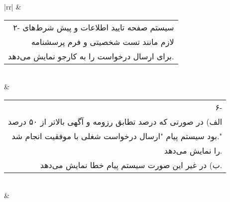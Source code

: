 \documentclass[12pt]{article}
\begin{document}
\begin{table}[]
\begin{tabular}{|rr|}
			                                           & \begin{tabular}[c]{@{}r@{}}۲- سیستم صفحه تایید اطلاعات و پیش شرط‌های\\  لازم مانند تست شخصیتی و فرم پرسشنامه\\  برای ارسال درخواست را به کارجو نمایش می‌دهد.\end{tabular}                                                                 \\ \hline
			 & \begin{tabular}[c]{@{}r@{}}۶- \\ الف) در صورتی که درصد تطابق رزومه و آگهی بالاتر از ۵۰ درصد\\  بود سیستم پیام "ارسال درخواست شغلی با موفقیت انجام شد." \\ را نمایش می‌دهد.\\ ب) در غیر این صورت سیستم پیام خطا نمایش می‌دهد.\end{tabular} \\ \hline
			                                   &                                                                                                                                                                                                                      \\ \hline
		\end{tabular}
		\end{table}
	
\end{document}
